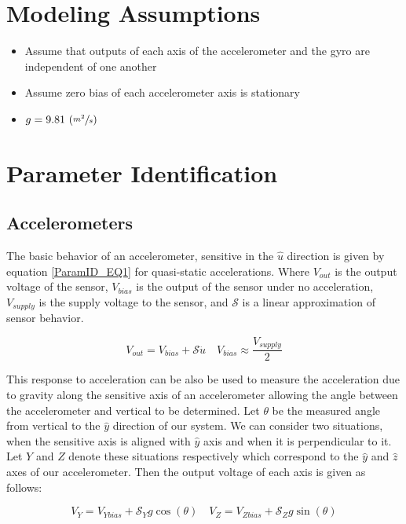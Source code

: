 \documentclass{article}
\theoremstyle{plain}
\theoremstyle{definition}
\theoremstyle{remark}
\newcommand{\Sens}{\mathcal{S}}
\begin{document}
\section{Modeling Assumptions}
\begin{itemize}
\item{Assume that outputs of each axis of the accelerometer and the gyro are independent of one another}
\item{Assume zero bias of each accelerometer axis is stationary} %
\item{$g = 9.81 \, \left( \sfrac{m^2}{s}\right) $}
\end{itemize}

\section{Parameter Identification}

\subsection*{Accelerometers}
The basic behavior of an accelerometer, sensitive in the $\hat{u}$ direction is given by equation \ref{ParamID_EQ1} for quasi-static accelerations.  Where $V_{out}$ is the output voltage of the sensor, $V_{bias}$ is the output of the sensor under no acceleration, $V_{supply}$ is the supply voltage to the sensor, and $\Sens$ is a linear approximation of sensor behavior.

\begin{equation}
V_{out} = V_{bias} + \Sens \ddot{u} \quad V_{bias} \approx \frac{V_{supply}}{2}
\label{ParamID_EQ1}
\end{equation}

This response to acceleration can be also be used to measure the acceleration due to gravity along the sensitive axis of an accelerometer allowing the angle between the accelerometer and vertical to be determined.  Let $\theta$ be the measured angle from vertical to the $\hat{y}$ direction of our system.  We can consider two situations, when the sensitive axis is aligned with $\hat{y}$ axis and when it is perpendicular to it.  Let $Y$ and $Z$ denote these situations respectively which correspond to the $\hat{y}$ and $\hat{z}$ axes of our accelerometer.  Then the output voltage of each axis is given as follows:

\begin{equation}
V_{Y} = V_{Ybias} + \Sens_{Y} g \cos(\theta) \quad V_{Z} = V_{Zbias} + \Sens_{Z} g \sin(\theta)
\label{ParamID_EQ2}
\end{equation}
\end{document}
